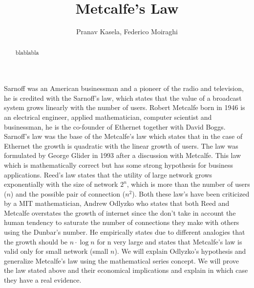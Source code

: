 \documentclass[12pt, a4page]{article}
\title{Metcalfe's Law}
\date{}
\author{Pranav Kasela, Federico Moiraghi}
\begin{document}
\maketitle
\begin{abstract}
blablabla
\end{abstract}
\newpage

Sarnoff was an American businessman and a pioneer of the radio and television, he is credited with the Sarnoff’s law, which states that the value of a broadcast system grows linearly with the number of users.
Robert Metcalfe born in 1946 is an electrical engineer, applied mathematician, computer scientist and businessman, he is the co-founder of Ethernet together with David Boggs.\newline
Sarnoff’s law was the base of the Metcalfe’s law which states that in the case of Ethernet the growth is quadratic with the linear growth of users. The law was formulated by George Glider in 1993 after a discussion with Metcalfe. This law which is mathematically correct but has some strong hypothesis for business applications. \newline
Reed’s law states that the utility of large network grows exponentially with the size of network $2^n$, which is more than the number of users ($n$) and the possible pair of connection ($n^2$).
Both these law’s have been criticized by a MIT mathematician, Andrew Odlyzko who states that both Reed and Metcalfe overstates the growth of internet since the don’t take in account the human tendency to saturate the number of connections they make with others using the Dunbar’s number. He empirically states due to different analogies that the growth should be $n\cdot \log n$ for n very large and states that Metcalfe’s law is valid only for small network (small $n$). We will explain Odlyzko’s hypothesis and generalize Metcalfe’s law using the mathematical series concept.\newline
We will prove the law stated above and their economical implications and explain in which case they have a real evidence.
\newpage
\end{document}
